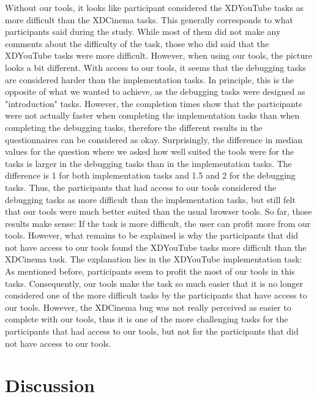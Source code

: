 Without our tools, it looks like participant considered the XDYouTube tasks as more difficult than the XDCinema tasks. This generally corresponds to what participants said during the study. While most of them did not make any comments about the difficulty of the task, those who did said that the XDYouTube tasks were more difficult. However, when using our tools, the picture looks a bit different. With access to our tools, it seems that the debugging tasks are considered harder than the implementation tasks. In principle, this is the opposite of what we wanted to achieve, as the debugging tasks were designed as "introduction" tasks. However, the completion times show that the participants were not actually faster when completing the implementation tasks than when completing the debugging tasks, therefore the different results in the questionnaires can be considered as okay. Surprisingly, the difference in median values for the question where we asked how well suited the tools were for the tasks is larger in the debugging tasks than in the implementation tasks. The difference is 1 for both implementation tasks and 1.5 and 2 for the debugging tasks. Thus, the participants that had access to our tools considered the debugging tasks as more difficult than the implementation tasks, but still felt that our tools were much better suited than the usual browser tools. So far, those results make sense: If the task is more difficult, the user can profit more from our tools. However, what remains to be explained is why the participants that did not have access to our tools found the XDYouTube tasks more difficult than the XDCinema task. The explanation lies in the XDYouTube implementation task: As mentioned before, participants seem to profit the most of our tools in this tasks. Consequently, our tools make the task so much easier that it is no longer considered one of the more difficult tasks by the participants that have access to our tools. However, the XDCinema bug was not really perceived as easier to complete with our tools, thus it is one of the more challenging tasks for the participants that had access to our tools, but not for the participants that did not have access to our tools.

\section{Discussion}

